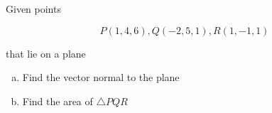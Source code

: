 \begin{example}
	Given points

	\begin{equation*}
		P(1,4,6), Q(-2,5,1), R(1,-1,1)
	\end{equation*}

	that lie on a plane

	\begin{enumerate}[a)]
		\item Find the vector normal to the plane
		\item Find the area of $\triangle{PQR}$
	\end{enumerate}
\end{example}